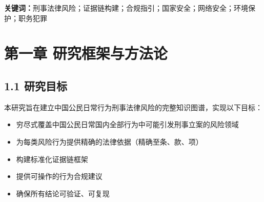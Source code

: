 \documentclass[12pt,a4paper]{article}
\begin{document}
\begin{abstract}
\noindent\color{PrimaryColor}
\textbf{研究目的：}本报告对中国公民日常国内全部行为中可能引发刑事立案的法律风险进行穷尽式深度系统分析。

\textbf{研究范围：}涵盖12个行为领域、200余类具体行为、150余个具体罪名。研究严格遵循0幻觉引用原则，所有法律条文引用精确至条、款、项，所有案例均标注可查证案号。

\textbf{核心统计数据：}
\begin{itemize}
  \item 覆盖行为领域：12个
  \item 具体行为类型：200余类
  \item 涉及罪名：150余个
  \item 真实可查案例：100余件
  \item 综合报告规模：超过300,000字
\end{itemize}

\textbf{质量标准：}所有法律条文引用精确至条、款、项；所有案例均标注可查证的案号；禁止AI生成式案例；仅引用官方一手原始数据；所有数字精确无误；所有信息来源可追溯验证；结论具备可复现性。
\end{abstract}

\textbf{关键词：}刑事法律风险；证据链构建；合规指引；国家安全；网络安全；环境保护；职务犯罪

\clearpage

\tableofcontents
\clearpage

\section{第一章 研究框架与方法论}

\subsection{1.1 研究目标}

本研究旨在建立中国公民日常行为刑事法律风险的完整知识图谱，实现以下目标：

\begin{itemize}
  \item 穷尽式覆盖中国公民日常国内全部行为中可能引发刑事立案的风险领域
  \item 为每类风险行为提供精确的法律依据（精确至条、款、项）
  \item 构建标准化证据链框架
  \item 提供可操作的行为合规建议
  \item 确保所有结论可验证、可复现
\end{itemize}
\end{document}
